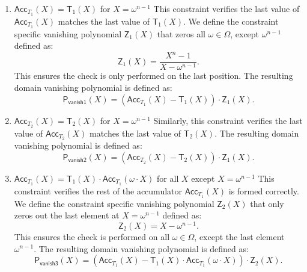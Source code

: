 \begin{enumerate}
    \item $\mathsf{Acc}_{T_1}(X)=\mathsf{T}_1(X)$ for $X = \omega^{n-1}$
    \newline This constraint verifies the last value of $\mathsf{Acc}_{T_1}(X)$ matches the last value of $\mathsf{T}_1(X)$. We define the constraint specific vanishing polynomial $\mathsf{Z}_1(X)$ that zeros all $\omega\in\Omega$, except $\omega^{n-1}$ defined as:
    \begin{equation}
    \label{eq:zv1}
    \mathsf{Z}_1(X)=\frac{X^n-1}{X-\omega^{n-1}}.
    \end{equation}
    This ensures the check is only performed on the last position. The resulting domain vanishing polynomial is defined as:
    \begin{equation}
    \label{eq:v1}
      \mathsf{P}_\mathsf{vanish1}(X)=(\mathsf{Acc}_{T_1}(X) - \mathsf{T}_1(X)) \cdot \mathsf{Z}_1(X).
    \end{equation}
    \item $\mathsf{Acc}_{T_2}(X)=\mathsf{T}_2(X)$ for $X = \omega^{n-1}$
    \newline Similarly, this constraint verifies the last value of $\mathsf{Acc}_{T_2}(X)$ matches the last value of $\mathsf{T}_2(X)$. The resulting domain vanishing polynomial is defined as:
    \begin{equation}
      \label{eq:v2}
    \mathsf{P}_\mathsf{vanish2}(X)=(\mathsf{Acc}_{T_2}(X) - \mathsf{T}_2(X)) \cdot \mathsf{Z}_1(X).
    \end{equation}
    \item $\mathsf{Acc}_{T_1}(X) = \mathsf{T}_1(X)\cdot \mathsf{Acc}_{T_1}(\omega\cdot X)$ for all $X$ except $X=\omega^{n-1}$
    \newline This constraint verifies the rest of the accumulator $\mathsf{Acc}_{T_1}(X)$ is formed correctly. We define the constraint specific vanishing polynomial $\mathsf{Z}_2(X)$ that only zeros out the last element at $X=\omega^{n-1}$ defined as:
    \begin{equation}
      \label{eq:zv2}
    \mathsf{Z}_2(X) = X-\omega^{n-1}.
    \end{equation}
    This ensures the check is performed on all $\omega\in\Omega$, except the last element $\omega^{n-1}$. The resulting domain vanishing polynomial is defined as:
    \begin{equation}
      \label{eq:v3}
    \mathsf{P}_\mathsf{vanish3}(X) = (\mathsf{Acc}_{T_1}(X) - \mathsf{T}_1(X)\cdot \mathsf{Acc}_{T_1}(\omega\cdot X))\cdot \mathsf{Z}_2(X).

\end{equation}
\end{enumerate}
